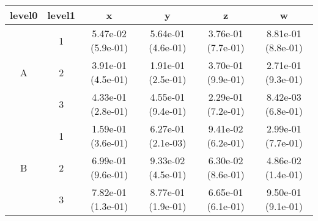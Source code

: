 \begin{tabular}{cccccc}
\toprule
level0 & level1&x&y&z&w\tabularnewline
\midrule
\multirow{3}{*}{A}&1& 5.47e-02 (5.9e-01)& 5.64e-01 (4.6e-01)& 3.76e-01 (7.7e-01)& 8.81e-01 (8.8e-01)\tabularnewline
&2& 3.91e-01 (4.5e-01)& 1.91e-01 (2.5e-01)& 3.70e-01 (9.9e-01)& 2.71e-01 (9.3e-01)\tabularnewline
&3& 4.33e-01 (2.8e-01)& 4.55e-01 (9.4e-01)& 2.29e-01 (7.2e-01)& 8.42e-03 (6.8e-01)\tabularnewline
\midrule
\multirow{3}{*}{B}&1& 1.59e-01 (3.6e-01)& 6.27e-01 (2.1e-03)& 9.41e-02 (6.2e-01)& 2.99e-01 (7.7e-01)\tabularnewline
&2& 6.99e-01 (9.6e-01)& 9.33e-02 (4.5e-01)& 6.30e-02 (8.6e-01)& 4.86e-02 (1.4e-01)\tabularnewline
&3& 7.82e-01 (1.3e-01)& 8.77e-01 (1.9e-01)& 6.65e-01 (6.1e-01)& 9.50e-01 (9.1e-01)\tabularnewline
\bottomrule
\end{tabular}
